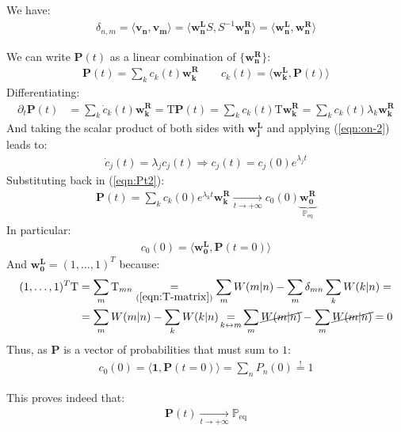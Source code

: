 \documentclass[../../main.tex]{subfiles}
\begin{document}
\begin{enumerate}
    We have:
    \begin{align}\label{eqn:on-2}
        \delta_{n,m} = \langle \bm{v_n}, \bm{v_m} \rangle = \langle \bm{w_n^L} S, S^{-1} \bm{w_n^R} \rangle = \langle \bm{w_n^L}, \bm{w_n^R} \rangle
    \end{align}

    We can write $\bm{P}(t)$ as a linear combination of $\{\bm{w_n^R}\}$:
    \begin{align}\label{eqn:Pt2}
        \bm{P}(t) = \sum_{k} c_k(t) \bm{w_k^R} \qquad c_k(t) = \langle \bm{w_k^L}, \bm{P}(t) \rangle
    \end{align}
    Differentiating:
    \begin{align*}
        \partial_t \bm{P}(t) &= \sum_{k} \dot{c}_k(t) \bm{w_k^R} = \mathrm{T} \bm{P}(t) = \sum_k c_k(t) \mathrm{T} \bm{w_k^R}= \sum_k c_k(t) \lambda_k \bm{w_k^R}
    \end{align*}
    And taking the scalar product of both sides with $\bm{w_j^L}$ and applying (\ref{eqn:on-2}) leads to:
    \begin{align*}
        \dot{c}_j(t) = \lambda_j c_j(t) \Rightarrow c_j(t) = c_j(0) e^{\lambda_j t}
    \end{align*}
    Substituting back in (\ref{eqn:Pt2}):
    \begin{align*}
        \bm{P}(t) = \sum_{k} c_k(0) e^{\lambda_k t} \bm{w_k^R}  \xrightarrow[t \to +\infty]{} c_0(0) \underbrace{\bm{w_0^R}}_{\mathbb{P}_{\mathrm{eq}}} 
    \end{align*}
    In particular:
    \begin{align*}
        c_0(0) = \langle \bm{w_0^L}, \bm{P}(t=0) \rangle
    \end{align*}
    And $\bm{w_0^L} = (1,\dots,1)^T$ because:
    \begin{align*}
        (1,\dots,1)^T \mathrm{T} &= \sum_{m} \mathrm{T}_{mn} \underset{(\ref{eqn:T-matrix})}{=}  \sum_m W(m|n) - \sum_m \delta_{mn} \sum_{k} W(k|n) =\\
        &= \sum_{m} W(m|n) - \sum_k W(k|n) \>\> \underset{\mathclap{k \leftrightarrow m}}{=} \>\> \sum_m \cancel{W(m|n)} - \sum_m \cancel{W(m|n)} = 0
    \end{align*}
    Thus, as $\bm{P}$ is a vector of probabilities that must sum to $1$:
    \begin{align*}
        c_0(0) = \langle \bm{1}, \bm{P}(t=0) \rangle = \sum_n P_n(0) \overset{!}{=} 1
    \end{align*}

    This proves indeed that:
    \begin{align*}
        \bm{P}(t)  \xrightarrow[t \to +\infty]{}  \mathbb{P}_{\mathrm{eq}}
    \end{align*}
\end{enumerate}
\end{document}

